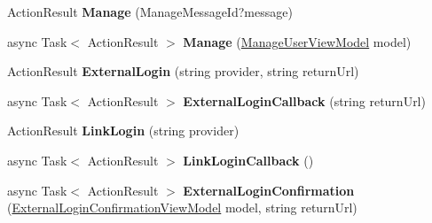 \begin{DoxyCompactItemize}
\item 
Action\+Result {\bfseries Manage} (Manage\+Message\+Id?message)\hypertarget{class_p_c_builder_m_v_c_1_1_controllers_1_1_account_controller_a9e62c1f787a32d28bd36d95684aec9fc}{}\label{class_p_c_builder_m_v_c_1_1_controllers_1_1_account_controller_a9e62c1f787a32d28bd36d95684aec9fc}

\item 
async Task$<$ Action\+Result $>$ {\bfseries Manage} (\hyperlink{class_p_c_builder_m_v_c_1_1_models_1_1_manage_user_view_model}{Manage\+User\+View\+Model} model)\hypertarget{class_p_c_builder_m_v_c_1_1_controllers_1_1_account_controller_aa54468166a91284e9ab801c6c93735be}{}\label{class_p_c_builder_m_v_c_1_1_controllers_1_1_account_controller_aa54468166a91284e9ab801c6c93735be}

\item 
Action\+Result {\bfseries External\+Login} (string provider, string return\+Url)\hypertarget{class_p_c_builder_m_v_c_1_1_controllers_1_1_account_controller_a7b9f58ec5691d7e5432aa85caabdce1a}{}\label{class_p_c_builder_m_v_c_1_1_controllers_1_1_account_controller_a7b9f58ec5691d7e5432aa85caabdce1a}

\item 
async Task$<$ Action\+Result $>$ {\bfseries External\+Login\+Callback} (string return\+Url)\hypertarget{class_p_c_builder_m_v_c_1_1_controllers_1_1_account_controller_aca010e9588956c6fcf9fd40992f8a9d5}{}\label{class_p_c_builder_m_v_c_1_1_controllers_1_1_account_controller_aca010e9588956c6fcf9fd40992f8a9d5}

\item 
Action\+Result {\bfseries Link\+Login} (string provider)\hypertarget{class_p_c_builder_m_v_c_1_1_controllers_1_1_account_controller_af4463ae5ae9ebdd71a7921459241af89}{}\label{class_p_c_builder_m_v_c_1_1_controllers_1_1_account_controller_af4463ae5ae9ebdd71a7921459241af89}

\item 
async Task$<$ Action\+Result $>$ {\bfseries Link\+Login\+Callback} ()\hypertarget{class_p_c_builder_m_v_c_1_1_controllers_1_1_account_controller_a5464ab822361c3aae7ea11b71afb2833}{}\label{class_p_c_builder_m_v_c_1_1_controllers_1_1_account_controller_a5464ab822361c3aae7ea11b71afb2833}

\item 
async Task$<$ Action\+Result $>$ {\bfseries External\+Login\+Confirmation} (\hyperlink{class_p_c_builder_m_v_c_1_1_models_1_1_external_login_confirmation_view_model}{External\+Login\+Confirmation\+View\+Model} model, string return\+Url)\hypertarget{class_p_c_builder_m_v_c_1_1_controllers_1_1_account_controller_a3e8a615f61a8cb1260ad3d1eeec2aa41}{}\label{class_p_c_builder_m_v_c_1_1_controllers_1_1_account_controller_a3e8a615f61a8cb1260ad3d1eeec2aa41}


\end{DoxyCompactItemize}
